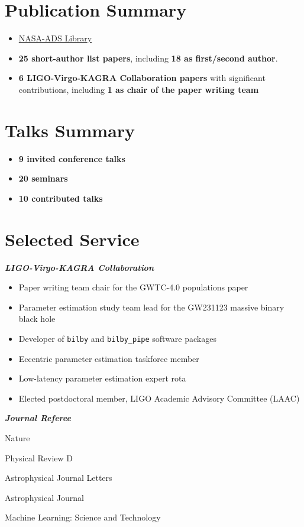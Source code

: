             \section{Publication Summary}
        \begin{itemize}[leftmargin=*]
            \item \href{https://ui.adsabs.harvard.edu/public-libraries/LqJDfKCTTdeuL_Inb7SwVw}{NASA-ADS Library}
            \item \textbf{25 short-author list papers}, including \textbf{18 as first/second author}.
            \item \textbf{6 LIGO-Virgo-KAGRA Collaboration papers} with significant contributions, including \textbf{1 as chair of the paper writing team}
        \end{itemize}

            \section{Talks Summary}
            \begin{itemize}[leftmargin=*]
            \item \textbf{9 invited conference talks}
            \item \textbf{20 seminars}
            \item \textbf{10 contributed talks}
            \end{itemize}

			\section{Selected Service}
			\textit{\textbf{LIGO-Virgo-KAGRA Collaboration}}
			\begin{itemize}[leftmargin=*]
            \item{Paper writing team chair for the GWTC-4.0 populations paper}
            \item{Parameter estimation study team lead for the GW231123 massive binary black hole}
            \item{Developer of \texttt{bilby} and \texttt{bilby\_pipe} software packages}
			\item{Eccentric parameter estimation taskforce member}
			\item{Low-latency parameter estimation expert rota}
			\item{Elected postdoctoral member, LIGO Academic Advisory Committee (LAAC)}
        	\end{itemize}
        	\textit{\textbf{Journal Referee}}\\
        	\begin{itemize*}[leftmargin=*]
        		\item Nature
        		\item Physical Review D
        		\item Astrophysical Journal Letters
        		\item Astrophysical Journal
        		\item Machine Learning: Science and Technology
        	\end{itemize*}


